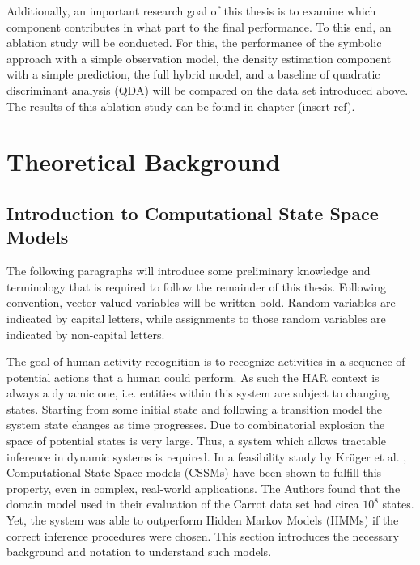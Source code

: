 \documentclass[11pt,titlepage,oneside,openany]{book}
\begin{document}
Additionally, an important research goal of this thesis is to examine which component contributes in what part to the final performance. To this end, an ablation study will be conducted. For this, the performance of the symbolic approach with a simple observation model, the density estimation component with a simple prediction, the full hybrid model, and a baseline of quadratic discriminant analysis (QDA) will be compared on the data set introduced above. The results of this ablation study can be found in chapter (insert ref).

 
 



\chapter{Theoretical Background}
\label{cha:theory}

\section{Introduction to Computational State Space Models}
\label{sec:cssm}
The following paragraphs will introduce some preliminary knowledge and terminology that is required to follow the remainder  of this thesis. Following convention, vector-valued variables will be written bold. Random variables are indicated by capital letters, while assignments to those random variables are indicated by non-capital letters.

The goal of human activity recognition is to recognize activities in a sequence of potential actions that a human could perform. As such the HAR context is always a dynamic one, i.e. entities within this system are subject to changing states. Starting from some initial state and following a transition model the system state changes as time progresses. Due to combinatorial explosion the space of potential states is very large. Thus, a system which allows tractable inference in dynamic systems is required. In a feasibility study by Kr\"uger et al.  \cite{kruger_computational_2014}, Computational State Space models (CSSMs) have been shown to fulfill this property, even in complex, real-world applications. The Authors found that the domain model used in their evaluation of the Carrot data set had circa $10^8$ states. Yet, the system was able to outperform Hidden Markov Models (HMMs) if the correct inference procedures were chosen. This section introduces the necessary background and notation to understand such models.
\end{document}

